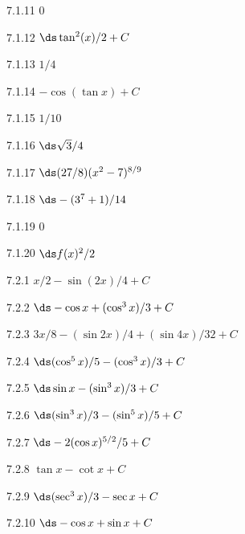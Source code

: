 \begin{Answer}{7.1.11}
 $0$
\end{Answer}
\begin{Answer}{7.1.12}
 $\ds \tan^2(x)/2+C$
\end{Answer}
\begin{Answer}{7.1.13}
 $1/4$
\end{Answer}
\begin{Answer}{7.1.14}
 $-\cos(\tan x)+C$
\end{Answer}
\begin{Answer}{7.1.15}
 $1/10$
\end{Answer}
\begin{Answer}{7.1.16}
 $\ds \sqrt3/4$
\end{Answer}
\begin{Answer}{7.1.17}
 $\ds (27/8)(x^2-7)^{8/9}$
\end{Answer}
\begin{Answer}{7.1.18}
 $\ds -(3^7+1)/14$
\end{Answer}
\begin{Answer}{7.1.19}
 $0$
\end{Answer}
\begin{Answer}{7.1.20}
 $\ds f(x)^2/2$
\end{Answer}
\begin{Answer}{7.2.1}
 $x/2-\sin(2x)/4+C$
\end{Answer}
\begin{Answer}{7.2.2}
 $\ds -\cos x+(\cos^3x)/3+C$
\end{Answer}
\begin{Answer}{7.2.3}
 $3x/8-(\sin 2x)/4+(\sin 4x)/32+C$
\end{Answer}
\begin{Answer}{7.2.4}
 $\ds (\cos^5 x)/5-(\cos^3x)/3+C$
\end{Answer}
\begin{Answer}{7.2.5}
 $\ds \sin x-(\sin^3x)/3+C$
\end{Answer}
\begin{Answer}{7.2.6}
 $\ds (\sin^3x)/3-(\sin^5x)/5+C$
\end{Answer}
\begin{Answer}{7.2.7}
 $\ds -2(\cos x)^{5/2}/5+C$
\end{Answer}
\begin{Answer}{7.2.8}
 $\tan x-\cot x+C$
\end{Answer}
\begin{Answer}{7.2.9}
 $\ds (\sec^3x)/3-\sec x+C$
\end{Answer}
\begin{Answer}{7.2.10}
 $\ds -\cos x+\sin x+C$
\end{Answer}
